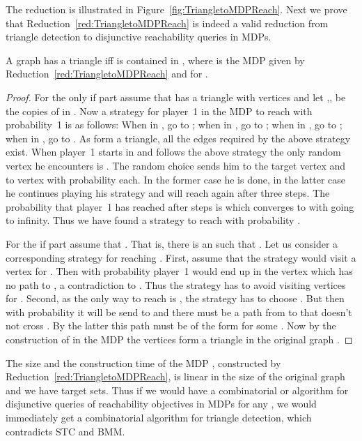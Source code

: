 \documentclass[11pt,letterpaper]{article}
\newif\iffullversion
\newcommand{\infull}[1]{\iffullversion #1\fi}
\begin{document}
The reduction is illustrated in Figure~\ref{fig:TriangletoMDPReach}.  \infull{
As all random choices are uniformly at random we omit the exact probabilities in the figures.

}
Next we prove that Reduction~\ref{red:TriangletoMDPReach} is indeed a valid reduction 
from triangle detection to disjunctive reachability queries in MDPs.

\begin{lemma}
A graph  has a triangle iff  is contained in , where 
 is the MDP  given by Reduction~\ref{red:TriangletoMDPReach} and   for .
\end{lemma}
\begin{proof}
 For the only if part assume that  has a triangle with vertices  and 
 let ,, be the copies of  in .
 Now a strategy for player~1 in the MDP  to reach  with probability~1 is as follows:
 When in , go to ; when in , go to ; when in , go to ;
 when in , go to .  
 As  form a triangle, all the edges required by the above strategy exist.
 When player~1 starts in  and follows the above strategy the only random vertex he 
 encounters is .
 The random choice sends him to the target vertex  and to vertex 
 with probability  each.
 In the former case he is done, in the latter case he continues playing his strategy and will reach  again after three steps.
 The probability that player~1 has reached  after  steps is 
 which converges to  with  going to infinity.
 Thus we have found a strategy to reach  with probability .

 For the if part assume that . 
 That is, there is an  such that .
 Let us consider a corresponding strategy for reaching .
 First, assume that the strategy would visit a vertex  for . 
 Then with probability  player~1 would end up in the vertex  which has no path to , 
 a contradiction to . 
 Thus the strategy has to avoid visiting vertices  for .
 Second, as the only way to reach  is , the strategy has to choose .
 But then with probability  it will be send to 
 and there must be a path from  to  that doesn't not cross .
 By the latter this path must be of the form  for some .
 Now by the construction of  in the MDP  the vertices  form a triangle in the original graph .
\end{proof}

The size and the construction time of the MDP , constructed by Reduction~\ref{red:TriangletoMDPReach}, is linear in the size of the 
original graph  and we have  target sets.
Thus if we would have a combinatorial  or 
 algorithm for 
disjunctive queries of reachability objectives in MDPs for any , we
would immediately get a combinatorial   algorithm for 
triangle detection, which contradicts STC and BMM.
\end{document}

